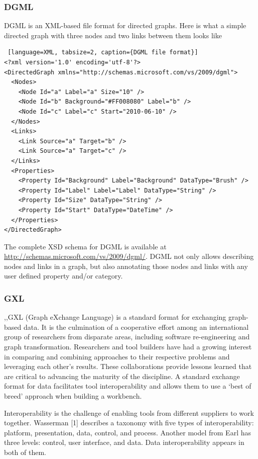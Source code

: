 \subsubsection{DGML}
DGML is an XML-based file format for directed graphs. Here is what a simple directed graph with three nodes and two links between them looks like

\begin{center}
\begin{lstlisting} [language=XML, tabsize=2, caption={DGML file format}]
<?xml version='1.0' encoding='utf-8'?>
<DirectedGraph xmlns="http://schemas.microsoft.com/vs/2009/dgml">
  <Nodes>
    <Node Id="a" Label="a" Size="10" />
    <Node Id="b" Background="#FF008080" Label="b" />
    <Node Id="c" Label="c" Start="2010-06-10" />
  </Nodes>
  <Links>
    <Link Source="a" Target="b" />
    <Link Source="a" Target="c" />
  </Links>
  <Properties>
    <Property Id="Background" Label="Background" DataType="Brush" />
    <Property Id="Label" Label="Label" DataType="String" />
    <Property Id="Size" DataType="String" />
    <Property Id="Start" DataType="DateTime" />
  </Properties>
</DirectedGraph>
\end{lstlisting}
\end{center}

The complete XSD schema for DGML is available at \url{http://schemas.microsoft.com/vs/2009/dgml/}. DGML not only allows describing nodes and links in a graph, but also annotating those nodes and links with any user defined property and/or category.

\subsubsection{GXL}
,,GXL (Graph eXchange Language) is a standard format for exchanging graph-based data. It is the culmination of a cooperative effort among an international group of researchers from disparate areas, including software re-engineering and graph transformation. Researchers and tool builders have had a growing interest in comparing and combining approaches to their respective problems and leveraging each other's results. These collaborations provide lessons learned that are critical to advancing the maturity of the discipline. A standard exchange format for data facilitates tool interoperability and allows them to use a `best of breed' approach when building a workbench.


Interoperability is the challenge of enabling tools from different suppliers to work together. Wasserman [1] describes a taxonomy with five types of interoperability: platform, presentation, data, control, and process. Another model from Earl has three levels: control, user interface, and data. Data interoperability appears in both of them.


